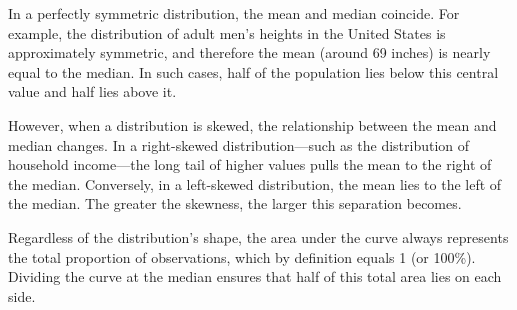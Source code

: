 \documentclass[
  letterpaper,
  DIV=11,
  numbers=noendperiod]{scrreprt}
\begin{document}
In a perfectly symmetric distribution, the mean and median coincide. For
example, the distribution of adult men's heights in the United States is
approximately symmetric, and therefore the mean (around 69 inches) is
nearly equal to the median. In such cases, half of the population lies
below this central value and half lies above it.

However, when a distribution is skewed, the relationship between the
mean and median changes. In a right-skewed distribution---such as the
distribution of household income---the long tail of higher values pulls
the mean to the right of the median. Conversely, in a left-skewed
distribution, the mean lies to the left of the median. The greater the
skewness, the larger this separation becomes.

Regardless of the distribution's shape, the area under the curve always
represents the total proportion of observations, which by definition
equals 1 (or 100\%). Dividing the curve at the median ensures that half
of this total area lies on each side.
\end{document}
